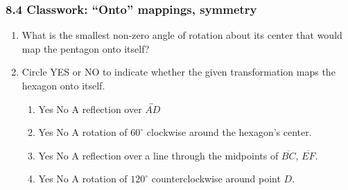 

\fancyhead[LE]{\thepage}



\subsubsection*{8.4 Classwork: ``Onto'' mappings, symmetry}
\begin{enumerate}
\item What is the smallest non-zero angle of rotation about its center that would map the pentagon onto itself? %
\begin{center}
  \end{center}

\item Circle YES or NO to indicate whether the given transformation maps the hexagon onto itself.
\vspace{0.5cm}
\begin{multicols}{2}
 \begin{enumerate}
  \item Yes \quad No \quad A reflection over $\overleftrightarrow{AD}$
  \item Yes \quad No \quad A rotation of $60^\circ$ clockwise around the hexagon's center.
  \item Yes \quad No \quad A reflection over a line through the midpoints of  $\overline{BC}$, $\overline{EF}$.
  \item Yes \quad No \quad A rotation of $120^\circ$ counterclockwise around point $D$.
  \end{enumerate}
\begin{center}
  \end{center}
\end{multicols} \vspace{0.5cm}


\end{enumerate}
